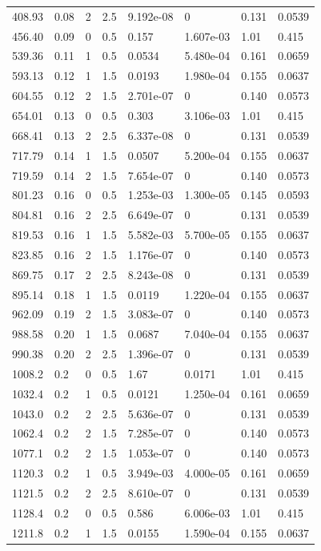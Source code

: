 \documentclass[preview]{standalone}
\begin{document}
{{\begin{tabular}{L{1.2cm}C{1.2cm} C{0.3cm}C{0.5cm} C{1.4cm}C{1.4cm} C{1.4cm}C{1.4cm}}
  408.93  &  0.08  & 2     & 2.5 &  9.192e-08  & 0  & 0.131 &  0.0539   \\ 
  456.40  &  0.09  & 0     & 0.5 &  0.157  & 1.607e-03  & 1.01 &  0.415   \\ 
  539.36  &  0.11  & 1     & 0.5 &  0.0534  & 5.480e-04  & 0.161 &  0.0659   \\ 
  593.13  &  0.12  & 1     & 1.5 &  0.0193  & 1.980e-04  & 0.155 &  0.0637   \\ 
  604.55  &  0.12  & 2     & 1.5 &  2.701e-07  & 0  & 0.140 &  0.0573   \\ 
  654.01  &  0.13  & 0     & 0.5 &  0.303  & 3.106e-03  & 1.01 &  0.415   \\ 
  668.41  &  0.13  & 2     & 2.5 &  6.337e-08  & 0  & 0.131 &  0.0539   \\ 
  717.79  &  0.14  & 1     & 1.5 &  0.0507  & 5.200e-04  & 0.155 &  0.0637   \\ 
  719.59  &  0.14  & 2     & 1.5 &  7.654e-07  & 0  & 0.140 &  0.0573   \\ 
  801.23  &  0.16  & 0     & 0.5 &  1.253e-03  & 1.300e-05  & 0.145 &  0.0593   \\ 
  804.81  &  0.16  & 2     & 2.5 &  6.649e-07  & 0  & 0.131 &  0.0539   \\ 
  819.53  &  0.16  & 1     & 1.5 &  5.582e-03  & 5.700e-05  & 0.155 &  0.0637   \\ 
  823.85  &  0.16  & 2     & 1.5 &  1.176e-07  & 0  & 0.140 &  0.0573   \\ 
  869.75  &  0.17  & 2     & 2.5 &  8.243e-08  & 0  & 0.131 &  0.0539   \\ 
  895.14  &  0.18  & 1     & 1.5 &  0.0119  & 1.220e-04  & 0.155 &  0.0637   \\ 
  962.09  &  0.19  & 2     & 1.5 &  3.083e-07  & 0  & 0.140 &  0.0573   \\ 
  988.58  &  0.20  & 1     & 1.5 &  0.0687  & 7.040e-04  & 0.155 &  0.0637   \\ 
  990.38  &  0.20  & 2     & 2.5 &  1.396e-07  & 0  & 0.131 &  0.0539   \\ 
  1008.2  &   0.2  & 0     & 0.5 &  1.67  & 0.0171  & 1.01 &  0.415   \\ 
  1032.4  &   0.2  & 1     & 0.5 &  0.0121  & 1.250e-04  & 0.161 &  0.0659   \\ 
  1043.0  &   0.2  & 2     & 2.5 &  5.636e-07  & 0  & 0.131 &  0.0539   \\ 
  1062.4  &   0.2  & 2     & 1.5 &  7.285e-07  & 0  & 0.140 &  0.0573   \\ 
  1077.1  &   0.2  & 2     & 1.5 &  1.053e-07  & 0  & 0.140 &  0.0573   \\ 
  1120.3  &   0.2  & 1     & 0.5 &  3.949e-03  & 4.000e-05  & 0.161 &  0.0659   \\ 
  1121.5  &   0.2  & 2     & 2.5 &  8.610e-07  & 0  & 0.131 &  0.0539   \\ 
  1128.4  &   0.2  & 0     & 0.5 &  0.586  & 6.006e-03  & 1.01 &  0.415   \\ 
  1211.8  &   0.2  & 1     & 1.5 &  0.0155  & 1.590e-04  & 0.155 &  0.0637   \\ 
\hline 
\end{tabular} 

}}
\end{document}
